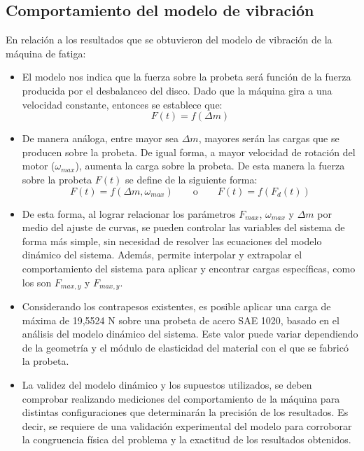 \subsection{Comportamiento del modelo de vibración}
En relación a los resultados que se obtuvieron del modelo de vibración de la máquina de fatiga:
\begin{itemize}
	\item El modelo nos indica que la fuerza sobre la probeta será función de la fuerza producida por el desbalanceo del disco. Dado que la máquina gira a una velocidad constante, entonces se establece que:
	\begin{equation*}
		F(t) = f(\Delta m)
	\end{equation*}
	\item De manera análoga, entre mayor sea $\Delta m$, mayores serán las cargas que se producen sobre la probeta. De igual forma, a mayor velocidad de rotación del motor ($\omega_{max}$), aumenta la carga sobre la probeta. De esta manera la fuerza sobre la probeta $F(t)$ se define de la siguiente forma:
	\begin{equation*}
		F(t) = f (\Delta m, \omega_{max}) \qquad \text{o} \qquad F(t) = f(F_d(t))
	\end{equation*}
	\item De esta forma, al lograr relacionar los parámetros $F_{max}$, $\omega_{max}$ y $\Delta m$ por medio del ajuste de curvas, se pueden controlar las variables del sistema de forma más simple, sin necesidad de resolver las ecuaciones del modelo dinámico del sistema. Además, permite interpolar y extrapolar el comportamiento del sistema para aplicar y encontrar cargas específicas, como los son $F_{max,y}$ y $F_{max,y}$.
	\item Considerando los contrapesos existentes, es posible aplicar una carga de máxima de 19,5524 N sobre una probeta de acero SAE 1020, basado en el análisis del modelo dinámico del sistema. Este valor puede variar dependiendo de la geometría y el módulo de elasticidad del material con el que se fabricó la probeta.
	\item La validez del modelo dinámico y los supuestos utilizados, se deben comprobar realizando mediciones del comportamiento de la máquina para distintas configuraciones que determinarán la precisión de los resultados. Es decir, se requiere de una validación experimental del modelo para corroborar la congruencia física del problema y la exactitud de los resultados obtenidos.
\end{itemize}

